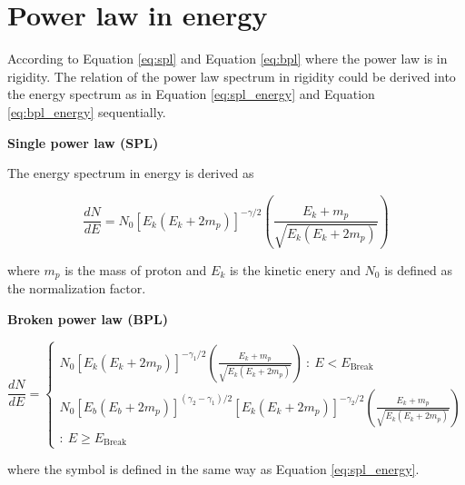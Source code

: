 \chapter{Power law in energy}
\label{appendix:pw_energy}

According to Equation \ref{eq:spl} and Equation \ref{eq:bpl}
where the power law is in rigidity. The relation of the 
power law spectrum in rigidity could be derived into the 
energy spectrum as in Equation \ref{eq:spl_energy} and 
Equation \ref{eq:bpl_energy} sequentially. 

\textbf{Single power law (SPL)}

The energy spectrum in energy is derived as

\begin{equation}
    \frac{dN}{dE} = N_0[E_k(E_k+2m_p)]^{-\gamma/2} \left(\frac{E_k+m_p}{\sqrt{E_k(E_k+2m_p)}}\right)
    \label{eq:spl_energy}
\end{equation}

where $m_p$ is the mass of proton and $E_k$ is the kinetic 
enery and $N_0$ is defined as the normalization factor.


\textbf{Broken power law (BPL)}

\begin{equation}
\frac{dN}{dE}=
  \begin{cases}
    N_0[E_k(E_k+2m_p)]^{-\gamma_1/2} \left(\frac{E_k+m_p}{\sqrt{E_k(E_k+2m_p)}}\right)\ :\ E < E_{\text{Break}}\\
    N_0[E_b(E_b+2m_p)]^{(\gamma_2-\gamma_1)/2}[E_k(E_k+2m_p)]^{-\gamma_2/2} \left(\frac{E_k+m_p}{\sqrt{E_k(E_k+2m_p)}}\right)\\ :\ E \ge E_{\text{Break}}
  \end{cases}
  \label{eq:bpl_energy}
\end{equation}

where the symbol is defined in the same way as Equation \ref{eq:spl_energy}.
